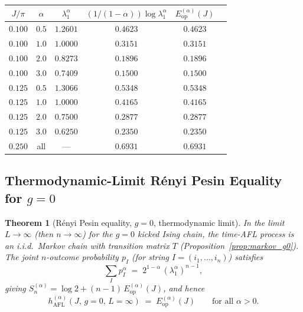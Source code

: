 \documentclass[12pt,a4paper]{article}
\newtheorem{theorem}{Theorem}[section]
\begin{document}
\begin{center}
\begin{tabular}{@{}cccccc@{}}
\toprule
$J/\pi$ & $\alpha$ & $\lambda^\alpha_1$ & $(1/(1-\alpha))\log\lambda^\alpha_1$ & $E^{(\alpha)}_\mathrm{op}(J)$\\
\midrule
$0.100$ & $0.5$ & $1.2601$ & $0.4623$ & $0.4623$\\
$0.100$ & $1.0$ & $1.0000$ & $0.3151$ & $0.3151$\\
$0.100$ & $2.0$ & $0.8273$ & $0.1896$ & $0.1896$\\
$0.100$ & $3.0$ & $0.7409$ & $0.1500$ & $0.1500$\\
$0.125$ & $0.5$ & $1.3066$ & $0.5348$ & $0.5348$\\
$0.125$ & $1.0$ & $1.0000$ & $0.4165$ & $0.4165$\\
$0.125$ & $2.0$ & $0.7500$ & $0.2877$ & $0.2877$\\
$0.125$ & $3.0$ & $0.6250$ & $0.2350$ & $0.2350$\\
$0.250$ & all  & --- & $0.6931$ & $0.6931$\\
\bottomrule
\end{tabular}
\end{center}

\subsection{Thermodynamic-Limit Rényi Pesin Equality for $g=0$}

\begin{theorem}[Rényi Pesin equality, $g=0$, thermodynamic limit]
\label{thm:renyi_pesin_g0}
In the limit $L\to\infty$ (then $n\to\infty$) for the $g=0$ kicked Ising chain,
the time-AFL process is an i.i.d.\ Markov chain with transition matrix $T$
(Proposition~\ref{prop:markov_g0}).  The joint $n$-outcome probability $p_I$
(for string $I=(i_1,\ldots,i_n)$) satisfies
\[
  \sum_I p_I^\alpha \;=\; 2^{1-\alpha}\,(\lambda^\alpha_1)^{n-1},
\]
giving $S^{(\alpha)}_n = \log 2 + (n-1)\,E^{(\alpha)}_\mathrm{op}(J)$, and hence
\begin{equation}\label{eq:hAFL_g0}
  h^{(\alpha)}_\mathrm{AFL}(J,\,g=0,\,L=\infty)
  \;=\; E^{(\alpha)}_\mathrm{op}(J)
  \qquad\text{for all }\alpha>0.
\end{equation}
\end{theorem}
\end{document}
